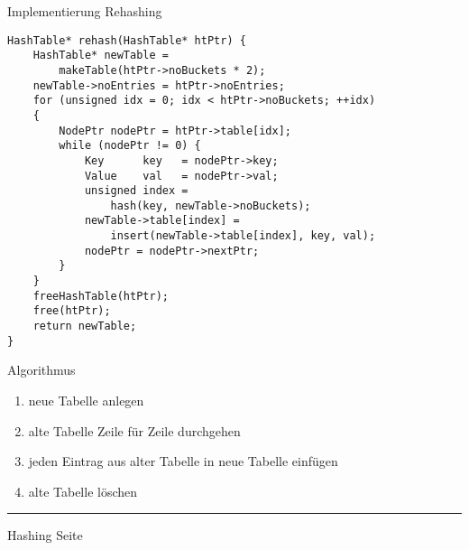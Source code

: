 
\begin{slide}{}
\normalsize

\begin{center}
Implementierung Rehashing
\end{center}
\vspace*{0.5cm}

\footnotesize
\begin{verbatim}
HashTable* rehash(HashTable* htPtr) {
    HashTable* newTable = 
        makeTable(htPtr->noBuckets * 2);
    newTable->noEntries = htPtr->noEntries;
    for (unsigned idx = 0; idx < htPtr->noBuckets; ++idx) 
    {
        NodePtr nodePtr = htPtr->table[idx];
        while (nodePtr != 0) {
            Key      key   = nodePtr->key;
            Value    val   = nodePtr->val;
            unsigned index = 
                hash(key, newTable->noBuckets);
            newTable->table[index] = 
                insert(newTable->table[index], key, val);
            nodePtr = nodePtr->nextPtr;
        }
    }
    freeHashTable(htPtr);
    free(htPtr);
    return newTable;
}
\end{verbatim}
Algorithmus
\begin{enumerate}
\item neue Tabelle anlegen
\item alte Tabelle Zeile f\"ur Zeile durchgehen
\item jeden Eintrag aus alter Tabelle in neue Tabelle einf\"ugen
\item alte Tabelle l\"oschen
\end{enumerate}

\vspace*{\fill}
\tiny \addtocounter{mypage}{1}
\rule{17cm}{1mm}
Hashing  \hspace*{\fill} Seite 
\end{slide}


